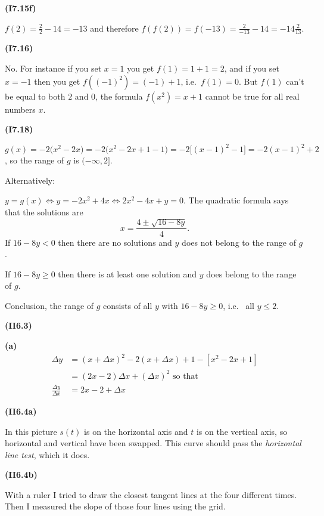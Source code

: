 \documentclass[openany,reqno]{amsbook}
\begin{document}
\begin{trivlist}
\item[{\bf(I7.15f)}]

  $f(2) = \frac{2}{2}-14 = -13 $ and therefore $f(f(2)) = f(-13) = \frac{2}{-13}-14 = -14\frac2{13} $.
  \bigskip

\item[{\bf(I7.16)}]

  No.  For instance if you set $x=1$ you get $f(1) = 1+1=2$, and if you set
  $x=-1$ then you get $f((-1)^2) = (-1)+1$, i.e.\ $f(1) = 0$.  But $f(1)$
  can't be equal to both $2$ and $0$, the formula $f(x^2) = x+1$ cannot be
  true for all real numbers $x$.
  \bigskip

\item[{\bf(I7.18)}]

  $g(x) = -2\bigl(x^2-2x\bigr)
  = -2\bigl(x^2-2x+1 -1\bigr)
  = -2\bigl[(x-1)^2 -1\bigr]
  =-2(x-1)^2 + 2$, so the range of $g$ is $(-\infty, 2]$.

  Alternatively:

  $y = g(x) \iff y = -2x^2+4x \iff 2x^2-4x+y = 0$.
  The quadratic formula says that the solutions are
  \[
    x= \frac{4\pm\sqrt{16-8y}} {4}.
  \]
  If $16-8y<0$ then there are no solutions and $y$ does
  not belong to the range of $g$.

  If $16-8y\geq0$ then there is at least one solution
  and  $y$ does belong to the range of $g$.

  Conclusion, the range of $g$ consists of all $y$ with
  $16-8y\geq 0$, i.e.~ all $y\leq2$.
  \bigskip

\item[{\bf(II6.3)}]

  \textbf{(a)}
  \begin{align*}
    \Delta y &= (x+\Delta x)^2  -2 (x+\Delta x)+1 - [x^2-2x+1]\\
    &=(2x-2)\Delta x +(\Delta x)^2 \text{ so that}\\
    \frac{\Delta y}{\Delta x}&= 2x-2 + \Delta x
  \end{align*}
  \bigskip

\item[{\bf(II6.4a)}]

  In this picture $s(t)$ is on the horizontal axis and $t$ is on the vertical axis, so
  horizontal and vertical have been swapped. This curve should pass the \emph{horizontal
  line test}, which it does.
  \bigskip

\item[{\bf(II6.4b)}]

  With a ruler I tried to draw the closest tangent lines at
  the four different times.  Then I measured the slope of those
  four lines using the grid.
  \bigskip


\end{trivlist}
\end{document}

